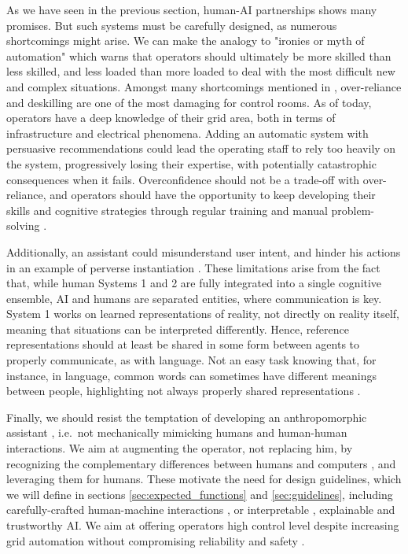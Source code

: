 \documentclass{IOS-Book-Article}
\begin{document}
As we have seen in the previous section, human-AI partnerships shows many promises. But such systems must be carefully designed, as numerous shortcomings might arise. We can make the analogy to "ironies or myth of automation" \cite{bainbridge1983ironies,bradshaw2013seven} which warns that operators should ultimately be more skilled than less skilled, and less loaded than more loaded to deal with the most difficult new and complex situations. Amongst many shortcomings mentioned in  \cite{machines-as-teammates}, over-reliance and deskilling are one of the most damaging for control rooms. As of today, operators have a deep knowledge of their grid area, both in terms of infrastructure and electrical phenomena. Adding an automatic system with persuasive recommendations could lead the operating staff to rely too heavily on the system, progressively losing their expertise, with potentially catastrophic consequences when it fails. Overconfidence should not be a trade-off with over-reliance, and operators should have the opportunity to keep developing their skills and cognitive strategies through regular training and manual problem-solving \cite{bainbridge1983ironies}. 

Additionally, an assistant could misunderstand user intent, and hinder his actions in an example of perverse instantiation \cite{goertzel2015superintelligence}.
These limitations arise from the fact that, while human Systems 1 and 2 are fully integrated into a single cognitive ensemble, AI and humans are separated entities, where communication is key. System 1 works on learned representations of reality, not directly on reality itself, meaning that situations can be interpreted differently. Hence, reference representations should at least be shared in some form between agents to properly communicate, as with language. Not an easy task knowing that, for instance, in language, common words can sometimes have different meanings between people, highlighting not always properly shared representations \cite{marti2019same}. 

Finally, we should resist the temptation of developing an anthropomorphic assistant \cite{mumford2010technics}, i.e.\ not mechanically mimicking humans and human-human interactions. We aim at augmenting the operator, not replacing him, by recognizing the complementary differences between humans and computers \cite{licklider1960man}, and leveraging them for humans.
These motivate the need for design guidelines, which we will define in sections \ref{sec:expected_functions} and \ref{sec:guidelines}, including carefully-crafted human-machine interactions \cite{blanchet:hal-03113458}, or interpretable \cite{doshi2017towards}, explainable \cite{adadi2018peeking} and trustworthy \cite{european2020white} AI. We aim at offering operators high control level despite increasing grid automation without compromising reliability and safety \cite{shneiderman2020human}.
\end{document}
